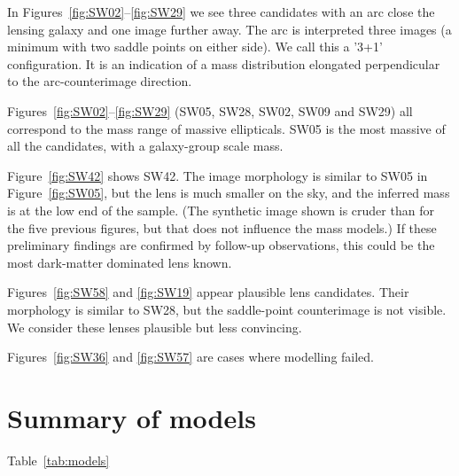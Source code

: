 \documentclass[fleqn,usenatbib]{mnras}
\newcommand{\figref}[1]{\ref{fig:#1}}
\begin{document}
In Figures~\figref{SW02}--\figref{SW29} we see three candidates with
an arc close the lensing galaxy and one image further away.  The arc
is interpreted three images (a minimum with two saddle points on
either side).  We call this a '3+1' configuration.  It is an
indication of a mass distribution elongated perpendicular to the
arc-counterimage direction.

Figures~\figref{SW02}--\figref{SW29} (SW05, SW28, SW02, SW09 and SW29)
all correspond to the mass range of massive ellipticals.  SW05 is the
most massive of all the candidates, with a galaxy-group scale mass.

Figure~\figref{SW42} shows SW42.  The image morphology is similar to
SW05 in Figure~\figref{SW05}, but the lens is much smaller on the sky,
and the inferred mass is at the low end of the sample.  (The synthetic
image shown is cruder than for the five previous figures, but that
does not influence the mass models.)  If these preliminary findings
are confirmed by follow-up observations, this could be the most
dark-matter dominated lens known.

Figures~\figref{SW58} and \figref{SW19} appear plausible lens
candidates.  Their morphology is similar to SW28, but the saddle-point
counterimage is not visible.  We consider these lenses plausible but
less convincing.

Figures~\figref{SW36} and \figref{SW57} are cases where modelling
failed.


\section{Summary of models}\label{sec:summary}

Table~\ref{tab:models} 
\end{document}
